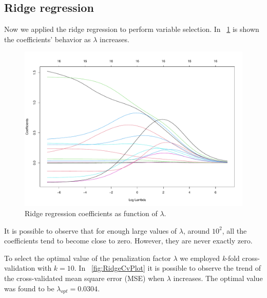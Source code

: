 \subsection{Ridge regression}

Now we applied the ridge regression to perform variable selection. In \Fig~\ref{fig:RidgeCoefVsLambda} is shown the coefficients' behavior as $\lambda$ increases. 

\begin{figure}[h]
	\centering
	\includegraphics[width=0.4\linewidth]{ImageFiles/Regression/Ridge/RidgeCoefVsLambda}
	\caption{Ridge regression coefficients as function of $\lambda$.}
	\label{fig:RidgeCoefVsLambda}
\end{figure}

It is possible to observe that for enough large values of $\lambda$, around $10^2$, all the coefficients tend to become close to zero. However, they are never exactly zero.

To select the optimal value of the penalization factor $\lambda$ we employed \textit{k}-fold cross-validation with $\textit{k}=10$. In \Fig~\ref{fig:RidgeCvPlot} it is possible to observe the trend of the cross-validated mean square error (MSE) when $\lambda$ increases. The optimal value was found to be $\lambda_{opt} = 0.0304$.

